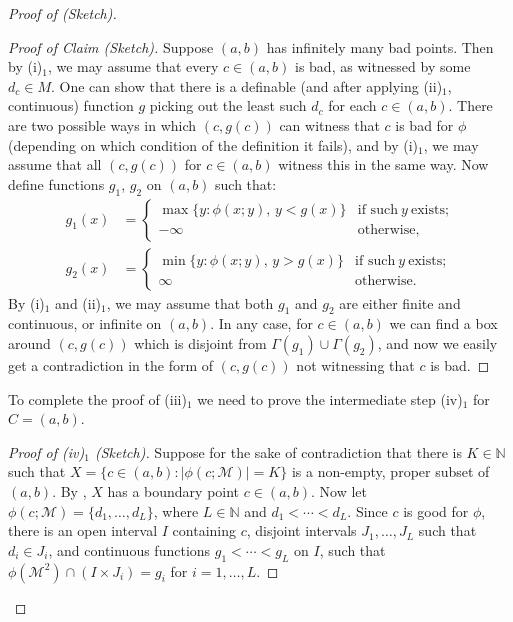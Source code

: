 \documentclass[a4paper]{report}
\makeatletter
\newcommand{\Nat}{\mathbb{N}}
\newcommand{\M}{\mathcal{M}}
\theoremstyle{definition}
\theoremstyle{remstyle}
\providecommand*{\dashv}{%
	\mathrel{%
		\mathpalette\@dashv\vdash
	}%
}
\newcommand*{\@dashv}[2]{%
	\reflectbox{$\m@th#1#2$}%
}
\newenvironment{subproof}[1][\proofname]{%
	\renewcommand{\qedsymbol}{$\dashv$}%
	\begin{proof}[#1]%
	}{%
	\end{proof}%
}
\makeatother
\begin{document}
\begin{proof}[Proof of  (Sketch)]
\begin{itemize}[leftmargin=*,itemsep=12pt]
\begin{enumerate}[itemsep=12pt,label=(\roman*)$_1$]
			            \begin{subproof}[Proof of Claim (Sketch)]
				            Suppose $(a,b)$ has infinitely many bad points. Then by (i)$_1$, we may assume that every $c\in(a,b)$ is bad, as witnessed by some $d_c\in M$. One can show that there is a definable (and after applying (ii)$_1$, continuous) function $g$ picking out the least such $d_c$ for each $c\in (a,b)$. There are two possible ways in which $(c,g(c))$ can witness that $c$ is bad for $\phi$ (depending on which condition of the definition it fails), and by (i)$_1$, we may assume that all $(c,g(c))$ for $c\in(a,b)$ witness this in the same way. Now define functions $g_1$, $g_2$ on $(a,b)$ such that:
				            \begin{equation*}
					            \begin{aligned}
						            g_1(x) & =
						            \begin{cases}
							            \max\{y:\phi(x;y),\,y<g(x)\} & \text{if such}\ y\ \text{exists;} \\
							            -\infty                      & \text{otherwise},
						            \end{cases}
						            \\
						            g_2(x) & =
						            \begin{cases}
							            \min\{y:\phi(x;y),\,y>g(x)\} & \text{if such}\ y\ \text{exists;} \\
							            \infty                       & \text{otherwise}.
						            \end{cases}
					            \end{aligned}
				            \end{equation*}
				            By (i)$_1$ and (ii)$_1$, we may assume that both $g_1$ and $g_2$ are either finite and continuous, or infinite on $(a,b)$. In any case, for $c\in(a,b)$ we can find a box around $(c,g(c))$ which is disjoint from $\Gamma(g_1)\cup\Gamma(g_2)$, and now we easily get a contradiction in the form of $(c,g(c))$ not witnessing that $c$ is bad.
			            \end{subproof}

			            To complete the proof of (iii)$_1$ we need to prove the intermediate step (iv)$_1$ for $C=(a,b)$.

			            \begin{subproof}[Proof of (iv)$_\mathit{1}$ (Sketch)]
				            Suppose for the sake of contradiction that there is $K\in\Nat$ such that $X=\{c\in(a,b):|\phi(c;\M)|=K\}$ is a non-empty, proper subset of $(a,b)$. By , $X$ has a boundary point $c\in(a,b)$. Now let $\phi(c;\M)=\{d_1,\ldots,d_L\}$, where $L\in\Nat$ and $d_1<\cdots<d_L$. Since $c$ is good for $\phi$, there is an open interval $I$ containing $c$, disjoint intervals $J_1,\ldots,J_L$ such that $d_i\in J_i$, and continuous functions $g_1<\cdots<g_L$ on $I$, such that $\phi(\M^2)\cap (I\times J_i)=g_i$ for $i=1,\ldots,L$.


\end{subproof}
\end{enumerate}
\end{itemize}
\end{proof}
\end{document}

